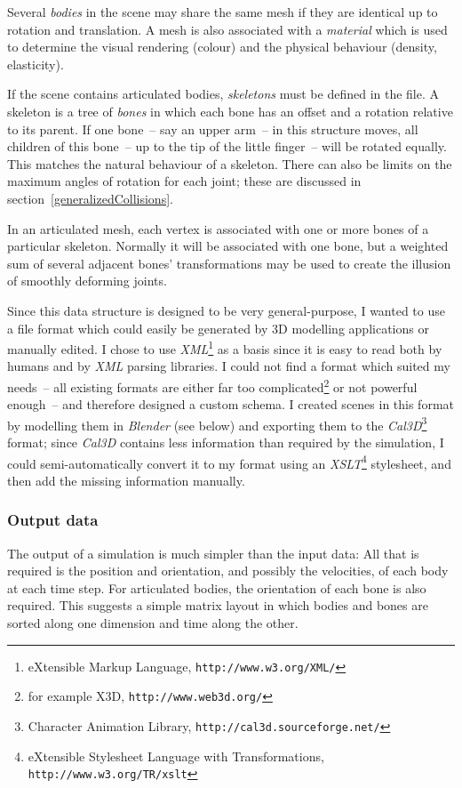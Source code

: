 Several \emph{bodies} in the scene may share the same mesh if they are identical up to rotation
and translation. A mesh is also associated with a \emph{material} which is used to determine the
visual rendering (colour) and the physical behaviour (density, elasticity).

If the scene contains articulated bodies, \emph{skeletons} must be defined in the file. A skeleton
is a tree of \emph{bones} in which each bone has an offset and a rotation relative to its parent.
If one bone~-- say an upper arm~-- in this structure moves, all children of this bone~-- up to
the tip of the little finger~-- will be rotated equally. This matches the natural behaviour of a
skeleton. There can also be limits on the maximum angles of rotation for each joint; these are
discussed in section~\ref{generalizedCollisions}.

In an articulated mesh, each vertex is associated with one or more bones of a particular skeleton.
Normally it will be associated with one bone, but a weighted sum of several adjacent
bones' transformations may be used to create the illusion of smoothly deforming joints.

Since this data structure is designed to be very general-purpose, I wanted to use a file format
which could easily be generated by 3D modelling applications or manually edited. I chose to use
\textsl{XML}\footnote{eXtensible Markup Language, \texttt{http://www.w3.org/XML/}} as a basis
since it is easy to read both by humans and by \textsl{XML} parsing libraries. I could not
find a format which suited my needs~-- all existing formats are either far too
complicated\footnote{for example X3D, \texttt{http://www.web3d.org/}} or not
powerful enough~-- and therefore designed a custom schema. I created scenes in this format by
modelling them in \textsl{Blender} (see below) and exporting them to the
\textsl{Cal3D}\footnote{Character Animation Library, \texttt{http://cal3d.sourceforge.net/}}
format; since \textsl{Cal3D} contains less information than required by the simulation, I could
semi-automatically convert it to my format using an
\textsl{XSLT}\footnote{eXtensible Stylesheet Language with Transformations,
\texttt{http://www.w3.org/TR/xslt}} stylesheet, and then add the missing information manually.

\subsubsection{Output data}
The output of a simulation is much simpler than the input data: All that is required is the
position and orientation, and possibly the velocities, of each body at each time step. For
articulated bodies, the orientation of each bone is also required. This suggests a simple
matrix layout in which bodies and bones are sorted along one dimension and time along
the other.

